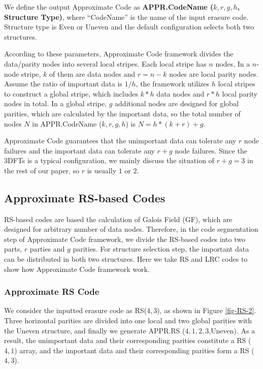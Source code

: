 \documentclass[sigconf]{acmart}
\begin{document}
We define the output Approximate Code as \textbf{APPR.CodeName ($k,r,g,h$, Structure Type)}, where ``CodeName'' is the name of the input erasure code. Structure type is Even or Uneven and the default configuration selects both two structures.

According to these parameters, Approximate Code framework divides the data/parity nodes into several local stripes. Each local stripe has $n$ nodes,  
In a $n$-node stripe, $k$ of them are data nodes and $r=n-k$ nodes are local parity nodes.
Assume the ratio of important data is $1/h$, the framework utilizes $h$ local stripes to construct a global stripe, which includes $k*h$ data nodes and $r*h$ local parity nodes in total.
In a global stripe, $g$ additional nodes are designed for global parities, which are calculated by the important data, so the total number of nodes $N$ in APPR.CodeName ($k,r,g,h$) is
$N= h*(k+r) + g$.

Approximate Code guarantees that the unimportant data can tolerate any $r$ node failures and the important data can tolerate any $r+g$ node failures.
Since the 3DFTs is a typical configuration, we mainly discuss the situation of $r+g=3$ in the rest of our paper, so $r$ is usually $1$ or $2$.%

\subsection{Approximate RS-based Codes}\label{appr-rsbased}
RS-based codes are based the calculation of Galois Field (GF), which are designed for arbitrary number of data nodes. Therefore, in the code segmentation step of  Approximate Code framework, we divide the RS-based codes into two parts, $r$ parties and $g$ parities. For structure selection step, the important data can be distributed in both two structures. Here we take RS and LRC codes to show how Approximate Code framework work.

\subsubsection{Approximate RS Code}
We consider the inputted erasure code as RS($4,3$), as shown in Figure \ref{fig-RS-2}. Three horizontal parities are divided into one local and two global parities with the Uneven structure, and finally we generate APPR.RS ($4,1,2,3$,Uneven).
As a result, the unimportant data and their corresponding parities constitute a RS ($4,1$) array, and the important data and their corresponding parities form a RS ($4,3$).
\end{document}
